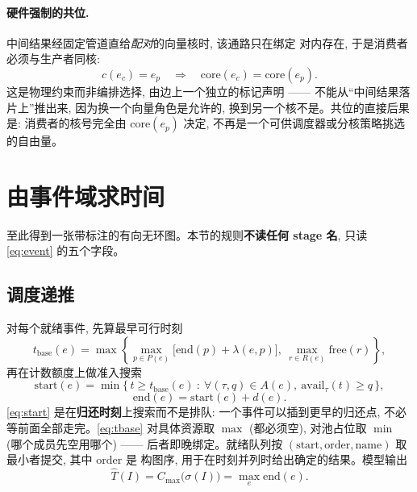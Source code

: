 \documentclass[11pt,a4paper]{article}
\begin{document}
\paragraph{硬件强制的共位.} 中间结果经固定管道直给\emph{配对}的向量核时, 该通路只在绑定
对内存在, 于是消费者必须与生产者同核:
\begin{equation}
c(e_c) = e_p \quad \Longrightarrow \quad \text{core}(e_c) = \text{core}(e_p).
\label{eq:coloc}
\end{equation}
这是物理约束而非编排选择, 由边上一个独立的标记声明 —— 不能从``中间结果落片上''推出来,
因为换一个向量角色是允许的, 换到另一个核不是。共位的直接后果是: 消费者的核号完全由
$\text{core}(e_p)$ 决定, 不再是一个可供调度器或分核策略挑选的自由量。

\section{由事件域求时间}
\label{sec:time}

至此得到一张带标注的有向无环图。本节的规则\textbf{不读任何 stage 名}, 只读
\eqref{eq:event} 的五个字段。

\subsection{调度递推}
\label{sec:sched}

对每个就绪事件, 先算最早可行时刻
\begin{equation}
t_{\text{base}}(e) = \max\left\{
  \max_{p\in P(e)}\big[\mathrm{end}(p) + \lambda(e,p)\big],\
  \max_{r\in R(e)} \mathrm{free}(r) \right\},
\label{eq:tbase}
\end{equation}
再在计数额度上做准入搜索
\begin{equation}
\mathrm{start}(e) = \min\big\{\, t \ge t_{\text{base}}(e)\ :\
   \forall (\tau,q) \in A(e),\ \mathrm{avail}_\tau(t) \ge q \,\big\},
\label{eq:start}
\end{equation}
\begin{equation}
\mathrm{end}(e) = \mathrm{start}(e) + d(e).
\label{eq:end}
\end{equation}
\eqref{eq:start} 是在\textbf{归还时刻}上搜索而不是排队: 一个事件可以插到更早的归还点,
不必等前面全部走完。\eqref{eq:tbase} 对具体资源取 $\max$ (都必须空), 对池占位取 $\min$
(哪个成员先空用哪个) —— 后者即晚绑定。就绪队列按
$(\mathrm{start}, \mathrm{order}, \mathrm{name})$ 取最小者提交, 其中 $\mathrm{order}$ 是
构图序, 用于在时刻并列时给出确定的结果。模型输出
\begin{equation}
\widehat{T}(I) = C_{\max}\big(\sigma(I)\big) = \max_e \mathrm{end}(e).
\label{eq:makespan}
\end{equation}
\end{document}
